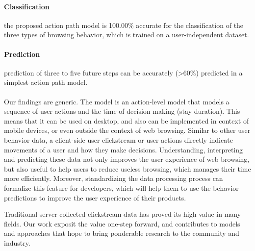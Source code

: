 \paragraph{Classification} the proposed action path model is 100.00\% accurate for 
the classification of the three types of browsing behavior, which is trained on a user-independent dataset.
\paragraph{Prediction} prediction of three to five future steps can be accurately (>60\%) predicted
in a simplest action path model.

\paragraph{}

Our findings are generic. The model is an action-level model that models
a sequence of user actions and the time of decision making (stay duration). This means 
that it can be used on desktop, and also can be implemented in context of mobile devices, 
or even outside the context of web browsing.
Similar to other user behavior data, a client-side user clickstream or user actions 
directly indicate movements of a user and how they make decisions. Understanding, 
interpreting and predicting these data not only improves the user experience of
web browsing, but also useful to help users to reduce useless browsing, which 
manages their time more efficiently. Moreover, standardizing the data processing process 
can formalize this feature for developers, which will help them to use the behavior predictions to
improve the user experience of their products.

Traditional server collected clickstream data has proved its high value in many 
fields. Our work exposit the value one-step forward, and contributes to models 
and approaches that hope to bring ponderable research to the community and industry.

\cleardoublepage